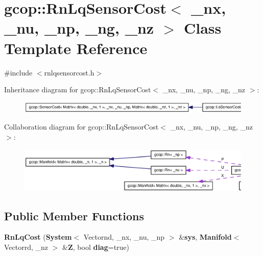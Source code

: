 \section{gcop\-:\-:\-Rn\-Lq\-Sensor\-Cost$<$ \-\_\-nx, \-\_\-nu, \-\_\-np, \-\_\-ng, \-\_\-nz $>$ \-Class \-Template \-Reference}
\label{classgcop_1_1RnLqSensorCost}


{\ttfamily \#include $<$rnlqsensorcost.\-h$>$}



\-Inheritance diagram for gcop\-:\-:\-Rn\-Lq\-Sensor\-Cost$<$ \-\_\-nx, \-\_\-nu, \-\_\-np, \-\_\-ng, \-\_\-nz $>$\-:
\nopagebreak
\begin{figure}[H]
\begin{center}
\leavevmode
\includegraphics[width=350pt]{classgcop_1_1RnLqSensorCost__inherit__graph}
\end{center}
\end{figure}


\-Collaboration diagram for gcop\-:\-:\-Rn\-Lq\-Sensor\-Cost$<$ \-\_\-nx, \-\_\-nu, \-\_\-np, \-\_\-ng, \-\_\-nz $>$\-:
\nopagebreak
\begin{figure}[H]
\begin{center}
\leavevmode
\includegraphics[width=350pt]{classgcop_1_1RnLqSensorCost__coll__graph}
\end{center}
\end{figure}
\subsection*{\-Public \-Member \-Functions}
\begin{DoxyCompactItemize}
\item 
{\bf \-Rn\-Lq\-Cost} ({\bf \-System}$<$ \-Vectornd, \-\_\-nx, \-\_\-nu, \-\_\-np $>$ \&{\bf sys}, {\bf \-Manifold}$<$ \-Vectorrd, \-\_\-nz $>$ \&{\bf \-Z}, bool {\bf diag}=true)
\end{DoxyCompactItemize}



